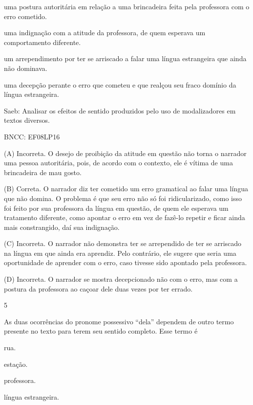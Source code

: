 \begin{escolha}
\item uma postura autoritária em relação a uma brincadeira feita pela
professora com o erro cometido.

\item uma indignação com a atitude da professora, de quem esperava um
comportamento diferente.

\item um arrependimento por ter se arriscado a falar uma língua estrangeira
que ainda não dominava.

\item uma decepção perante o erro que cometeu e que realçou seu fraco
domínio da língua estrangeira.
\end{escolha}

Saeb: Analisar os efeitos de sentido produzidos pelo uso de
modalizadores em textos diversos.

BNCC: EF08LP16

(A) Incorreta. O desejo de proibição da atitude em questão não torna o
narrador uma pessoa autoritária, pois, de acordo com o contexto, ele é
vítima de uma brincadeira de mau gosto.

(B) Correta. O narrador diz ter cometido um erro gramatical ao falar uma
língua que não domina. O problema é que seu erro não só foi
ridicularizado, como isso foi feito por sua professora da língua em
questão, de quem ele esperava um tratamento diferente, como apontar o
erro em vez de fazê-lo repetir e ficar ainda mais constrangido, daí sua
indignação.

(C) Incorreta. O narrador não demonstra ter se arrependido de ter se
arriscado na língua em que ainda era aprendiz. Pelo contrário, ele
sugere que seria uma oportunidade de aprender com o erro, caso tivesse
sido apontado pela professora.

(D) Incorreta. O narrador se mostra decepcionado não com o erro, mas com
a postura da professora ao caçoar dele duas vezes por ter errado.

\num{5}

As duas ocorrências do pronome possessivo ``dela'' dependem de outro
termo presente no texto para terem seu sentido completo. Esse termo é

\begin{escolha}
\item rua.

\item estação.

\item professora.

\item língua estrangeira.
\end{escolha}


